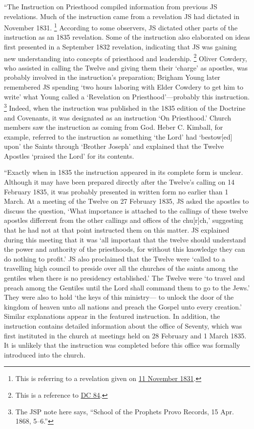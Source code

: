 			``The Instruction on Priesthood compiled information from previous JS revelations. Much of the instruction came from a revelation JS had dictated in November 1831.%
				\footnote{%
					This is referring to a revelation given on \hyperref[EMS-1831-JS-11-NOV-1831-B]{11 November 1831}.
					}
			According to some observers, JS dictated other parts of the instruction as an 1835 revelation. Some of the instruction also elaborated on ideas first presented in a September 1832 revelation, indicating that JS was gaining new understanding into concepts of priesthood and leadership.%
				\footnote{%
					This is a reference to \hyperref[DC84]{DC 84}.
					}
			Oliver Cowdery, who assisted in calling the Twelve and giving them their `charge' as apostles, was probably involved in the instruction's preparation; Brigham Young later remembered JS spending `two hours laboring with Elder Cowdery to get him to write' what Young called a `Revelation on Priesthood'---probably this instruction.%
				\footnote{%
					The JSP note here says, ``School of the Prophets Provo Records, 15 Apr. 1868, 5--6.''
					}
			Indeed, when the instruction was published in the 1835 edition of the Doctrine and Covenants, it was designated as an instruction `On Priesthood.' Church members saw the instruction as coming from God. Heber C. Kimball, for example, referred to the instruction as something `the Lord' had `bestow[ed] upon' the Saints through `Brother Joseph' and explained that the Twelve Apostles `praised the Lord' for its contents.
			
			``Exactly when in 1835 the instruction appeared in its complete form is unclear. Although it may have been prepared directly after the Twelve's calling on 14 February 1835, it was probably presented in written form no earlier than 1 March. At a meeting of the Twelve on 27 February 1835, JS asked the apostles to discuss the question, `What importance is attached to the callings of these twelve apostles differrent from the other callings and offices of the chu[r]ch,' suggesting that he had not at that point instructed them on this matter. JS explained during this meeting that it was `all important that the twelve should understand the power and authority of the priesthoods, for without this knowledge they can do nothing to profit.' JS also proclaimed that the Twelve were `called to a travelling high council to preside over all the churches of the saints among the gentiles when there is no presidency established.' The Twelve were `to travel and preach among the Gentiles until the Lord shall command them to go to the Jews.' They were also to hold `the keys of this ministry--- to unlock the door of the kingdom of heaven unto all nations and preach the Gospel unto every creation.' Similar explanations appear in the featured instruction. In addition, the instruction contains detailed information about the office of Seventy, which was first instituted in the church at meetings held on 28 February and 1 March 1835. It is unlikely that the instruction was completed before this office was formally introduced into the church.
			
